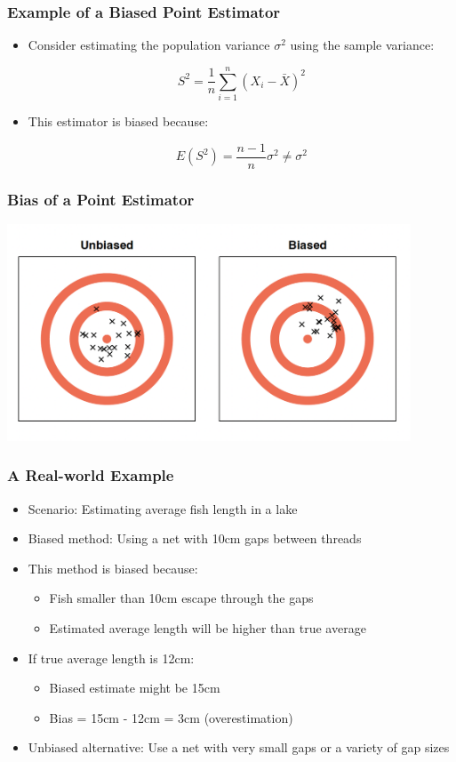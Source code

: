 \documentclass[12pt]{beamer}
\begin{document}
\begin{frame}
	\frametitle{Example of a Biased Point Estimator}
	
	\begin{itemize}[label={\color{blue}$\blacktriangleright$}]
		\item Consider estimating the population variance $\sigma^2$ using the sample variance:
		
		\[
		S^2 = \frac{1}{n} \sum_{i=1}^n (X_i - \bar{X})^2
		\]
		
		\item This estimator is biased because:
		
		\[
		E(S^2) = \frac{n-1}{n} \sigma^2 \neq \sigma^2
		\]
		
	\end{itemize}
	
	\end{frame}
\begin{frame}
	\frametitle{Bias of a Point Estimator}
	\includegraphics[width=12cm]{biase.png}
\end{frame}
\begin{frame}
	\frametitle{A Real-world Example}
	
	\begin{itemize}[label={\color{blue}$\blacktriangleright$}]
		\item Scenario: Estimating average fish length in a lake
		
		\item Biased method: Using a net with 10cm gaps between threads
		
		\item This method is biased because:
		\begin{itemize}
			\item Fish smaller than 10cm escape through the gaps
			\item Estimated average length will be higher than true average
		\end{itemize}
		
		\item If true average length is 12cm:
		\begin{itemize}
			\item Biased estimate might be 15cm
			\item Bias = 15cm - 12cm = 3cm (overestimation)
		\end{itemize}
		
		\item Unbiased alternative: Use a net with very small gaps or a variety of gap sizes
	\end{itemize}
	
\end{frame}
\end{document}
